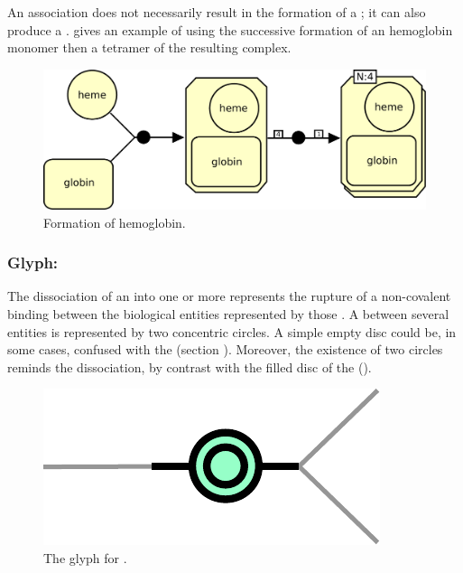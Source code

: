 An association does not necessarily result in the formation of a ; it can also produce a .  gives an example of using the successive formation of an hemoglobin monomer then a tetramer of the resulting complex.

\begin{figure}[htb]
  \centering
  \includegraphics[scale = 0.5]{le_images/association-multimerisation}
  \caption{Formation of hemoglobin.}
  \label{fig:assoc-multi}
\end{figure}


\subsubsection{Glyph: }\label{sec:dissociation}

The dissociation of an  into one or more  represents the rupture of a non-covalent binding between the biological entities represented by those . A  between several entities is represented by two concentric circles. A simple empty disc could be, in some cases, confused with the  (section ). Moreover, the existence of two circles reminds the dissociation, by contrast with the filled disc of the  ().

\begin{figure}[htb]
  \centering
  \includegraphics[scale = 0.5]{le_images/dissociation}
  \caption{The \PD glyph for .}
  \label{fig:dissociation}
\end{figure}


